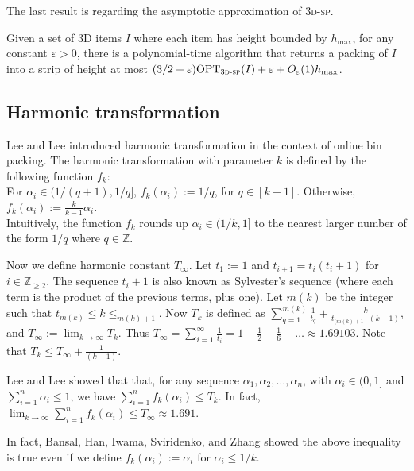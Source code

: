 \documentclass[a4paper,UKenglish,cleveref, autoref, thm-restate]{lipics-v2021}
\newcommand{\eps}{\varepsilon}
\newcommand{\opt}{\mathrm{OPT}}
\newcommand{\tsp}{\textsc{3d-sp}\xspace}
\begin{document}
The last result is regarding the asymptotic approximation of \tsp. 

\begin{theorem}
\label{thm:jpstrippacking}
    Given a set of 3D items $I$ where each item has height bounded by $h_{\max}$, for any constant $\eps >0$, there is a polynomial-time algorithm that returns a packing of $I$ into a strip of height at most $(3/2+\varepsilon)\opt_{\tsp}(I)+\varepsilon + O_{\varepsilon}(1)h_{\max}$.
\end{theorem}

\subsection{Harmonic transformation}
\label{subsec:harmonic}
Lee and Lee \cite{LeeL85} introduced harmonic transformation in the context of online bin packing. 
The harmonic transformation with parameter $k$ is defined by the following function $f_k$:\\
For $\alpha_i\in(1/(q+1),1/q]$,  $f_k(\alpha_i):=1/q$, for $q \in [k-1]$.
Otherwise, $f_k(\alpha_i):=\frac{k}{k-1}\alpha_i$.\\
Intuitively, the function $f_k$ rounds up $\alpha_i\in(1/k,1]$
to the nearest larger number of the form $1/q$ where $q\in \mathbb{Z}$. 

Now we define harmonic constant $T_{\infty}$.
Let $t_1:=1$ and $t_{i+1}=t_i(t_i+1)$ for $i \in \mathbb{Z}_{\ge 2}$. 
The sequence $t_i+1$ is also known as Sylvester's sequence (where each term is the product of the previous terms, plus one).
Let $m(k)$ be the integer such that $t_{m(k)}\le k \le _{m(k)+1}$.
Now $T_k$ is defined as $\sum_{q=1}^{m(k)}\frac{1}{t_q}+\frac{k}{t_{(m(k)+1}\cdot (k-1)}$, and $T_{\infty}:=\lim_{k \rightarrow \infty} T_k$.
Thus $T_{\infty}=\sum_{i=1}^{\infty} \frac{1}{t_i}=1+\frac12+\frac16+\dots \approx 1.69103$.
 Note that $T_k \le T_{\infty}+\frac{1}{(k-1)}$.


Lee and Lee \cite{LeeL85} showed that that, for any sequence $\alpha_1, \alpha_2, \dots, \alpha_n$, with $\alpha_i \in (0,1]$ and $\sum_{i=1}^n \alpha_i \le 1$,
we have $ \sum_{i=1}^n  f_k(\alpha_i) \le T_{k}$.  
In fact, $\lim_{k \rightarrow \infty} \sum_{i=1}^n  f_k(\alpha_i) \le T_{\infty} \approx 1.691$. 

In fact, Bansal, Han, Iwama, Sviridenko, and Zhang \cite{bansal2007harmonic} showed the above inequality is true even if we define $f_k(\alpha_i):=\alpha_i$ for $\alpha_i \le 1/k$.
\end{document}
